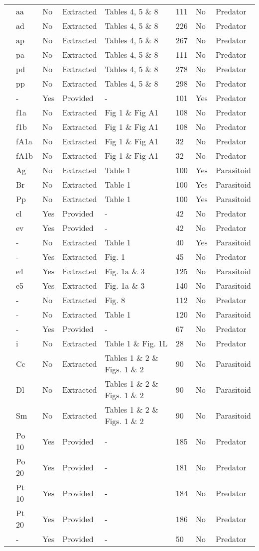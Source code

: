 \begin{longtable}{llllllll}
\citet{Eveleigh:1982aa}&aa&No&Extracted&Tables 4, 5 \& 8&111&No&Predator\tabularnewline
\citet{Eveleigh:1982aa}&ad&No&Extracted&Tables 4, 5 \& 8&226&No&Predator\tabularnewline
\citet{Eveleigh:1982aa}&ap&No&Extracted&Tables 4, 5 \& 8&267&No&Predator\tabularnewline
\citet{Eveleigh:1982aa}&pa&No&Extracted&Tables 4, 5 \& 8&111&No&Predator\tabularnewline
\citet{Eveleigh:1982aa}&pd&No&Extracted&Tables 4, 5 \& 8&278&No&Predator\tabularnewline
\citet{Eveleigh:1982aa}&pp&No&Extracted&Tables 4, 5 \& 8&298&No&Predator\tabularnewline
\citet{Fussmann:2005aa}&-&Yes&Provided&-&101&Yes&Predator\tabularnewline
\citet{Griffen:2007aa}&f1a&No&Extracted&Fig 1 \& Fig A1&108&No&Predator\tabularnewline
\citet{Griffen:2007aa}&f1b&No&Extracted&Fig 1 \& Fig A1&108&No&Predator\tabularnewline
\citet{Griffen:2007aa}&fA1a&No&Extracted&Fig 1 \& Fig A1&32&No&Predator\tabularnewline
\citet{Griffen:2007aa}&fA1b&No&Extracted&Fig 1 \& Fig A1&32&No&Predator\tabularnewline
\citet{Hassan:1976aa}&Ag&No&Extracted&Table 1&100&Yes&Parasitoid\tabularnewline
\citet{Hassan:1976aa}&Br&No&Extracted&Table 1&100&Yes&Parasitoid\tabularnewline
\citet{Hassan:1976aa}&Pp&No&Extracted&Table 1&100&Yes&Parasitoid\tabularnewline
\citet{Hossie:2016aa}&cl&Yes&Provided&-&42&No&Predator\tabularnewline
\citet{Hossie:2016aa}&ev&Yes&Provided&-&42&No&Predator\tabularnewline
\citet{Huffaker:1982aa}&-&No&Extracted&Table 1&40&Yes&Parasitoid\tabularnewline
\citet{Johnson:2006aa}&-&Yes&Extracted&Fig. 1&45&No&Predator\tabularnewline
\citet{Jones:1988aa, Jones:1986aa}&e4&Yes&Extracted&Fig. 1a \& 3&125&No&Parasitoid\tabularnewline
\citet{Jones:1988aa, Jones:1986aa}&e5&Yes&Extracted&Fig. 1a \& 3&140&No&Parasitoid\tabularnewline
\citet{Katz:1985ai}&-&No&Extracted&Fig. 8&112&No&Predator\tabularnewline
\citet{Kfir:1983aa}&-&No&Extracted&Table 1&120&No&Parasitoid\tabularnewline
\citet{Kratina:2009aa}&-&Yes&Provided&-&67&No&Predator\tabularnewline
\citet{Krylov:1992aa}&i&No&Extracted&Table 1 \& Fig. 1L&28&No&Predator\tabularnewline
\citet{Kumar:1985aa}&Cc&No&Extracted&Tables 1 \& 2 \& Figs. 1 \& 2&90&No&Parasitoid\tabularnewline
\citet{Kumar:1985aa}&Dl&No&Extracted&Tables 1 \& 2 \& Figs. 1 \& 2&90&No&Parasitoid\tabularnewline
\citet{Kumar:1985aa}&Sm&No&Extracted&Tables 1 \& 2 \& Figs. 1 \& 2&90&No&Parasitoid\tabularnewline
\citet{Lang:2012aa}&Po 10&Yes&Provided&-&185&No&Predator\tabularnewline
\citet{Lang:2012aa}&Po 20&Yes&Provided&-&181&No&Predator\tabularnewline
\citet{Lang:2012aa}&Pt 10&Yes&Provided&-&184&No&Predator\tabularnewline
\citet{Lang:2012aa}&Pt 20&Yes&Provided&-&186&No&Predator\tabularnewline
\citet{Long:2012aa}&-&Yes&Provided&-&50&No&Predator\tabularnewline

\end{longtable}
